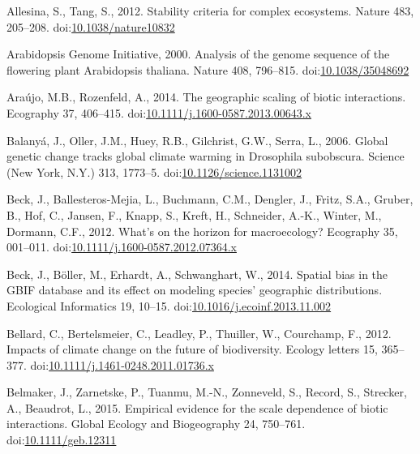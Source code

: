 \hypertarget{refs}{}
\hypertarget{ref-Allesina2012a}{}
Allesina, S., Tang, S., 2012. Stability criteria for complex ecosystems.
Nature 483, 205--208.
doi:\href{https://doi.org/10.1038/nature10832}{10.1038/nature10832}

\hypertarget{ref-TheArabidopsisGenomeInitiative2000}{}
Arabidopsis Genome Initiative, 2000. Analysis of the genome sequence of
the flowering plant Arabidopsis thaliana. Nature 408, 796--815.
doi:\href{https://doi.org/10.1038/35048692}{10.1038/35048692}

\hypertarget{ref-Araujo2014}{}
Araújo, M.B., Rozenfeld, A., 2014. The geographic scaling of biotic
interactions. Ecography 37, 406--415.
doi:\href{https://doi.org/10.1111/j.1600-0587.2013.00643.x}{10.1111/j.1600-0587.2013.00643.x}

\hypertarget{ref-Balanya2006}{}
Balanyá, J., Oller, J.M., Huey, R.B., Gilchrist, G.W., Serra, L., 2006.
Global genetic change tracks global climate warming in Drosophila
subobscura. Science (New York, N.Y.) 313, 1773--5.
doi:\href{https://doi.org/10.1126/science.1131002}{10.1126/science.1131002}

\hypertarget{ref-Beck2012}{}
Beck, J., Ballesteros-Mejia, L., Buchmann, C.M., Dengler, J., Fritz,
S.A., Gruber, B., Hof, C., Jansen, F., Knapp, S., Kreft, H., Schneider,
A.-K., Winter, M., Dormann, C.F., 2012. What's on the horizon for
macroecology? Ecography 35, 001--011.
doi:\href{https://doi.org/10.1111/j.1600-0587.2012.07364.x}{10.1111/j.1600-0587.2012.07364.x}

\hypertarget{ref-Beck2014a}{}
Beck, J., Böller, M., Erhardt, A., Schwanghart, W., 2014. Spatial bias
in the GBIF database and its effect on modeling species' geographic
distributions. Ecological Informatics 19, 10--15.
doi:\href{https://doi.org/10.1016/j.ecoinf.2013.11.002}{10.1016/j.ecoinf.2013.11.002}

\hypertarget{ref-Bellard2012}{}
Bellard, C., Bertelsmeier, C., Leadley, P., Thuiller, W., Courchamp, F.,
2012. Impacts of climate change on the future of biodiversity. Ecology
letters 15, 365--377.
doi:\href{https://doi.org/10.1111/j.1461-0248.2011.01736.x}{10.1111/j.1461-0248.2011.01736.x}

\hypertarget{ref-Belmaker2015}{}
Belmaker, J., Zarnetske, P., Tuanmu, M.-N., Zonneveld, S., Record, S.,
Strecker, A., Beaudrot, L., 2015. Empirical evidence for the scale
dependence of biotic interactions. Global Ecology and Biogeography 24,
750--761.
doi:\href{https://doi.org/10.1111/geb.12311}{10.1111/geb.12311}

